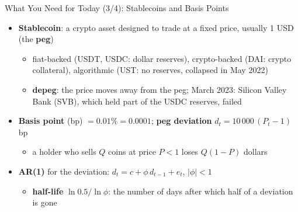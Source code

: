 \begin{frame}{What You Need for Today (3/4): Stablecoins and Basis Points}
\itemsize{\small}
\begin{itemize}
    \item \textbf{Stablecoin}: a crypto asset designed to trade at a fixed price, usually 1 USD (the \textbf{peg})
    \begin{itemize}
        \item fiat-backed (USDT, USDC: dollar reserves), crypto-backed (DAI: crypto collateral), algorithmic (UST: no reserves, collapsed in May 2022)
        \item \textbf{depeg}: the price moves away from the peg; March 2023: Silicon Valley Bank (SVB), which held part of the USDC reserves, failed
    \end{itemize}
    \item \textbf{Basis point} (bp) $= 0.01\% = 0.0001$; \textbf{peg deviation} $d_t = 10\,000\,(P_t - 1)$ bp
    \begin{itemize}
        \item a holder who sells $Q$ coins at price $P < 1$ loses $Q(1 - P)$ dollars
    \end{itemize}
    \item \textbf{AR(1)} for the deviation: $d_t = c + \phi\,d_{t-1} + e_t$, $|\phi| < 1$
    \begin{itemize}
        \item \textbf{half-life} $\ln 0.5/\ln\phi$: the number of days after which half of a deviation is gone
    \end{itemize}
\end{itemize}
\end{frame}

